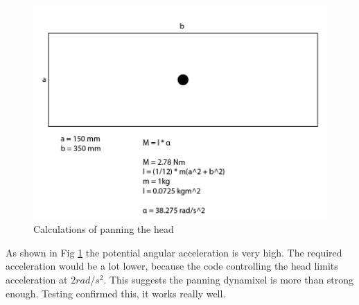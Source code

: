 \documentclass[technical_document.tex]{subfiles}
\begin{document}
\begin{figure}[ht!]
	\centering
	\mbox{\includegraphics[scale=0.4]{Images/head_pan.png}}
	\caption{Calculations of panning the head}
	\label{fig:head_pan}
\end{figure}


As shown in Fig \ref{fig:head_pan} the potential angular acceleration is very high. The required acceleration would be a lot lower, because the code controlling the head limits acceleration at $2rad/s^2$. This suggests the panning dynamixel is more than strong enough. Testing confirmed this, it works really well.
\end{document}
